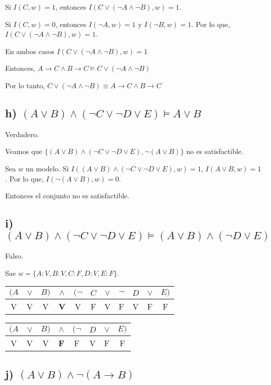 \documentclass[spanish]{article}
\begin{document}
Si $I(C,w)=1$, entonces $I(C \vee (\neg A \wedge \neg B),w)=1$.

Si $I(C,w)=0$, entonces $I(\neg A,w)=1$ y $I(\neg B,w)=1$. Por lo que, $I(C \vee (\neg A \wedge \neg B),w)=1$.

En ambos casos $I(C \vee (\neg A \wedge \neg B),w)=1$

Entonces, $A \rightarrow C\wedge B\rightarrow C\models C \vee (\neg A \wedge \neg B)$

Por lo tanto, $C \vee (\neg A \wedge \neg B) \equiv A \rightarrow C\wedge B\rightarrow C$

\subsection*{ h) $(A\vee B)\wedge (\neg C \vee \neg D \vee E)\models A \vee B$}

Verdadero.

Veamos que $\{(A\vee B)\wedge (\neg C \vee \neg D \vee E),\neg(A \vee B)\}$ no es satisfactible.

Sea $w$ un modelo. Si $I((A\vee B)\wedge (\neg C \vee \neg D \vee E),w)=1$, $I(A\vee B,w)=1$. Por lo que, $I(\neg(A\vee B),w)=0$.

Entonces el conjunto no es satisfactible.

\subsection*{ i) $(A\vee B)\wedge (\neg C \vee \neg D \vee E)\models (A \vee B)\wedge (\neg D \vee E)$}

Falso.

Sae $w=\{A:V,B:V,C:F,D:V,E:F\}$.

\begin{tabular}{ccccccccccc}
  $(A$ & $\vee$ & $B)$ & $\wedge$ & $(\neg$ & $C$ & $\vee$ & $\neg$ & $D$ & $\vee$ & $E)$ \\\hline
  V    & V      & V    & \bf V    & V       & F   & V      & F      & V   & F      & F
\end{tabular}


\begin{tabular}{cccccccc}
  $(A$ & $\vee$ & $B)$ & $\wedge$ & $(\neg$ & $D$ & $\vee$ & $E)$ \\\hline
  V    & V      & V    & \bf F    & F       & V   & F      & F
\end{tabular}


\subsection*{ j) $(A\vee B) \wedge \neg (A\rightarrow B)$}
\end{document}

